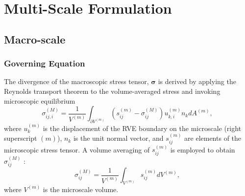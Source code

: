 \chapter{Multi-Scale Formulation}

\section{Macro-scale}

\subsection{Governing Equation}

The divergence of the macroscopic stress tensor, $\pmb{\sigma}$ is derived by applying the Reynolds transport theorem to the volume-averaged stress and invoking microscopic equilibrium \cite{Chandran:2007hy,Stylianopoulos:2007dp} 
%
\begin{equation}
\sigma_{ij,i}^{(M)} = \frac{1}{V^{(m)}} \int_{\partial V^{(m)}} \left( s_{ij}^{(m)} - \sigma_{ij}^{(M)} \right)u_{k,i}^{(m)} n_k dA^{(m)},
\label{eq:macro_stress_divergence}
\end{equation}
%
where $u_k^{(m)}$ is the displacement of the RVE boundary on the microscale (right superscript $(m)$), $n_k$ is the unit normal vector, and $s_{ij}^{(m)}$ are elements of the microscopic stress tensor. A volume averaging of $s_{ij}^{(m)}$ is employed to obtain $\sigma_{ij}^{(M)}$ \cite{Chandran:2007hy}:
%
\begin{equation}
\sigma_{ij}^{(M)} = \frac{1}{V^{(m)}}\int_{V^{(m)}}s_{ij}^{(m)} dV^{(m)},
\label{eq:macro_stress_volume_avg}
\end{equation}
%
where $V^{(m)}$ is the microscale volume.

